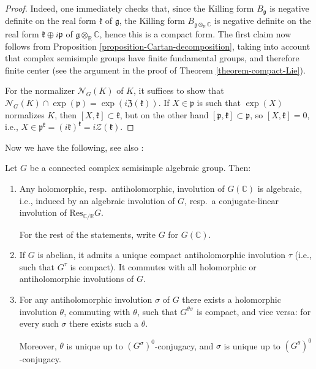\begin{proof}
 Indeed, one immediately checks that, since the Killing form $B_{\mathfrak g}$ is negative definite on the real form $\mathfrak k$ of $\mathfrak g$, the Killing form $B_{\mathfrak g \otimes_{\mathbb R} \mathbb C}$ is negative definite on the real form $\mathfrak k \oplus i \mathfrak p$ of $\mathfrak g \otimes_{\mathbb R} \mathbb C$, hence this is a compact form. The first claim now follows from Proposition \ref{proposition-Cartan-decomposition}, taking into account that complex semisimple groups have finite fundamental groups, and therefore finite center (see the argument in the proof of Theorem \ref{theorem-compact-Lie}).
 
 For the normalizer $\mathcal N_G(K)$ of $K$, it suffices to show that $\mathcal N_G(K) \cap \exp(\mathfrak p) = \exp(i \mathfrak Z(\mathfrak k))$. If $X\in \mathfrak p$ is such that $\exp(X)$ normalizes $K$, then $[X,\mathfrak k]\subset \mathfrak k$, but on the other hand $[\mathfrak p, \mathfrak k]\subset \mathfrak p$, so $[X,\mathfrak k]=0$, i.e., $X \in \mathfrak p^{\mathfrak k} = (i\mathfrak k )^{\mathfrak k} = i \mathcal Z(\mathfrak k)$. 
\end{proof}



Now we have the following, see also \cite{Adams-Taibi}:

\begin{proposition}
 \label{proposition-holomorphic-antiholomorphic}
Let $G$ be a connected complex semisimple algebraic group. Then:

\begin{enumerate}
 \item Any holomorphic, resp.\ antiholomorphic, involution of $G(\mathbb C)$ is algebraic, i.e., induced by an algebraic involution of $G$, resp.\ a conjugate-linear involution of $\text{Res}_{\mathbb C/\mathbb R} G$.
 
 For the rest of the statements, write $G$ for $G(\mathbb C)$.

 \item If $G$ is abelian, it admits a unique compact antiholomorphic involution $\tau$ (i.e., such that $G^\tau$ is compact). It commutes with all holomorphic or antiholomorphic involutions of $G$.

 \item For any antiholomorphic involution $\sigma$ of $G$ there exists a holomorphic involution $\theta$, commuting with $\theta$, such that $G^{\theta\sigma}$ is compact, and vice versa: for every such $\sigma$ there exists such a $\theta$. 

Moreover, $\theta$ is unique up to $(G^\sigma)^0$-conjugacy, and $\sigma$ is unique up to $(G^\theta)^0$-conjugacy. 
\end{enumerate}
\end{proposition}


